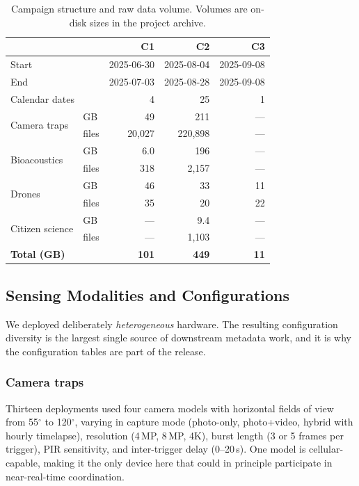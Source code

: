 \documentclass[sigconf]{acmart}
\begin{document}
\begin{table}[t]
\caption{Campaign structure and raw data volume. Volumes are
on-disk sizes in the project archive.}
\label{tab:campaigns}
\small
\begin{tabular}{llrrr}
\toprule
& & \textbf{C1} & \textbf{C2} & \textbf{C3} \\
\midrule
\multicolumn{2}{l}{Start} & 2025-06-30 & 2025-08-04 & 2025-09-08 \\
\multicolumn{2}{l}{End} & 2025-07-03 & 2025-08-28 & 2025-09-08 \\
\multicolumn{2}{l}{Calendar dates} & 4 & 25 & 1 \\
\midrule
\multirow{2}{*}{Camera traps} & GB & 49 & 211 & --- \\
 & files & 20{,}027 & 220{,}898 & --- \\
\multirow{2}{*}{Bioacoustics} & GB & 6.0 & 196 & --- \\
 & files & 318 & 2{,}157 & --- \\
\multirow{2}{*}{Drones} & GB & 46 & 33 & 11 \\
 & files & 35 & 20 & 22 \\
\multirow{2}{*}{Citizen science} & GB & --- & 9.4 & --- \\
 & files & --- & 1{,}103 & --- \\
\midrule
\multicolumn{2}{l}{\textbf{Total (GB)}} & \textbf{101} & \textbf{449} & \textbf{11} \\
\bottomrule
\end{tabular}
\end{table}

\subsection{Sensing Modalities and Configurations}

We deployed deliberately \emph{heterogeneous} hardware. The resulting
configuration diversity is the largest single source of downstream
metadata work, and it is why the configuration tables are part of the
release.

\subsubsection{Camera traps}
Thirteen deployments used four camera models with horizontal fields of
view from 55$^\circ$ to 120$^\circ$, varying in capture mode (photo-only,
photo+video, hybrid with hourly timelapse), resolution (4\,MP, 8\,MP,
4K), burst length (3 or 5 frames per trigger), PIR sensitivity, and
inter-trigger delay (0--20\,s). One model is cellular-capable, making it
the only device here that could in principle participate in
near-real-time coordination.
\end{document}
